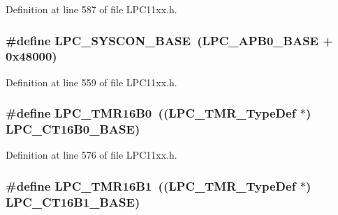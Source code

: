 Definition at line 587 of file L\+P\+C11xx.\+h.

\subsubsection[{\texorpdfstring{L\+P\+C\+\_\+\+S\+Y\+S\+C\+O\+N\+\_\+\+B\+A\+SE}{LPC_SYSCON_BASE}}]{\setlength{\rightskip}{0pt plus 5cm}\#define L\+P\+C\+\_\+\+S\+Y\+S\+C\+O\+N\+\_\+\+B\+A\+SE~({\bf L\+P\+C\+\_\+\+A\+P\+B0\+\_\+\+B\+A\+SE} + 0x48000)}\hypertarget{group___l_p_c11xx___definitions_ga976cd83a81fd89a472221e68f0c0fbff}{}\label{group___l_p_c11xx___definitions_ga976cd83a81fd89a472221e68f0c0fbff}


Definition at line 559 of file L\+P\+C11xx.\+h.

\subsubsection[{\texorpdfstring{L\+P\+C\+\_\+\+T\+M\+R16\+B0}{LPC_TMR16B0}}]{\setlength{\rightskip}{0pt plus 5cm}\#define L\+P\+C\+\_\+\+T\+M\+R16\+B0~(({\bf L\+P\+C\+\_\+\+T\+M\+R\+\_\+\+Type\+Def}    $\ast$) {\bf L\+P\+C\+\_\+\+C\+T16\+B0\+\_\+\+B\+A\+SE})}\hypertarget{group___l_p_c11xx___definitions_gae3e75d39e502088028bfe901b28f6471}{}\label{group___l_p_c11xx___definitions_gae3e75d39e502088028bfe901b28f6471}


Definition at line 576 of file L\+P\+C11xx.\+h.

\subsubsection[{\texorpdfstring{L\+P\+C\+\_\+\+T\+M\+R16\+B1}{LPC_TMR16B1}}]{\setlength{\rightskip}{0pt plus 5cm}\#define L\+P\+C\+\_\+\+T\+M\+R16\+B1~(({\bf L\+P\+C\+\_\+\+T\+M\+R\+\_\+\+Type\+Def}    $\ast$) {\bf L\+P\+C\+\_\+\+C\+T16\+B1\+\_\+\+B\+A\+SE})}\hypertarget{group___l_p_c11xx___definitions_gad82d36f91fa86aad5e3d57f5543e4cf6}{}\label{group___l_p_c11xx___definitions_gad82d36f91fa86aad5e3d57f5543e4cf6}


